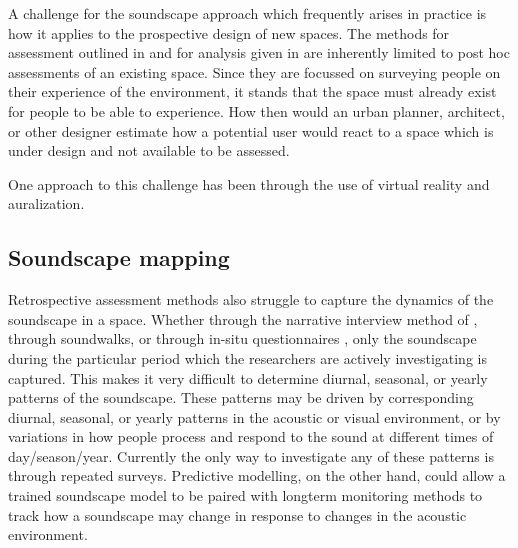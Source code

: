 A challenge for the soundscape approach which frequently arises in practice is how it applies to the prospective design of new spaces. The methods for assessment outlined in \citet{ISO12913Part2} and for analysis given in \citet{ISO12913Part3} are inherently limited to post hoc assessments of an existing space. Since they are focussed on surveying people on their experience of the environment, it stands that the space must already exist for people to be able to experience. How then would an urban planner, architect, or other designer estimate how a potential user would react to a space which is under design and not available to be assessed.

One approach to this challenge has been through the use of virtual reality and auralization.

\subsection{Soundscape mapping}

Retrospective assessment methods also struggle to capture the dynamics of the soundscape in a space. Whether through the narrative interview method of , through soundwalks, or through in-situ questionnaires \citep{Mitchell2020Soundscape}, only the soundscape during the particular period which the researchers are actively investigating is captured. This makes it very difficult to determine diurnal, seasonal, or yearly patterns of the soundscape. These patterns may be driven by corresponding diurnal, seasonal, or yearly patterns in the acoustic or visual environment, or by variations in how people process and respond to the sound at different times of day/season/year. Currently the only way to investigate any of these patterns is through repeated surveys. Predictive modelling, on the other hand, could allow a trained soundscape model to be paired with longterm monitoring methods to track how a soundscape may change in response to changes in the acoustic environment. 

